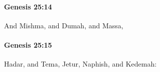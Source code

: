 		\paragraph{Genesis 25:14} %
			\label{GENESIS-25-14}

			And Mishma, and Dumah, and Massa,


		\paragraph{Genesis 25:15} %
			\label{GENESIS-25-15}

			Hadar, and Tema, Jetur, Naphish, and Kedemah:


